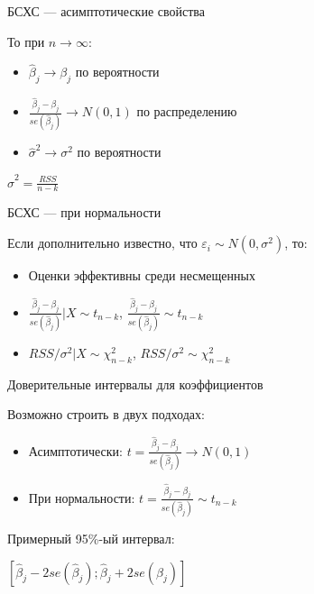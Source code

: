 \documentclass[ignorenonframetext,]{beamer}
\begin{document}
\begin{frame}{БСХС --- асимптотические свойства}

То при \(n\to \infty\):

\begin{itemize}
\itemsep1pt\parskip0pt
\item
  \(\hat{\beta}_j \to \beta_j\) по вероятности
\item
  \(\frac{\hat{\beta}_j-\beta_j}{se(\hat{\beta}_j)} \to N(0,1)\) по
  распределению
\item
  \(\hat{\sigma}^2 \to \sigma^2\) по вероятности
\end{itemize}

\(\hat{\sigma}^2=\frac{RSS}{n-k}\)

\end{frame}

\begin{frame}{БСХС --- при нормальности}

Если дополнительно известно, что \(\varepsilon_i \sim N(0, \sigma^2)\),
то:

\begin{itemize}
\itemsep1pt\parskip0pt
\item
  Оценки эффективны среди несмещенных
\item
  \(\frac{\hat{\beta}_j-\beta_j}{se(\hat{\beta}_j)}|X \sim t_{n-k}\),
  \(\frac{\hat{\beta}_j-\beta_j}{se(\hat{\beta}_j)}\sim t_{n-k}\)
\item
  \(RSS/\sigma^2 |X \sim \chi^2_{n-k}\),
  \(RSS/\sigma^2 \sim \chi^2_{n-k}\)
\end{itemize}

\end{frame}

\begin{frame}{Доверительные интервалы для коэффициентов}

Возможно строить в двух подходах:

\begin{itemize}
\item
  Асимптотически:
  \(t=\frac{\hat{\beta}_j-\beta_j}{se(\hat{\beta}_j)} \to N(0,1)\)
\item
  При нормальности:
  \(t=\frac{\hat{\beta}_j-\beta_j}{se(\hat{\beta}_j)} \sim t_{n-k}\)
\end{itemize}

Примерный 95\%-ый интервал:

\([\hat{\beta}_j-2se(\hat{\beta}_j);\hat{\beta}_j+2se(\hat{\beta}_j) ]\)

\end{frame}
\end{document}
